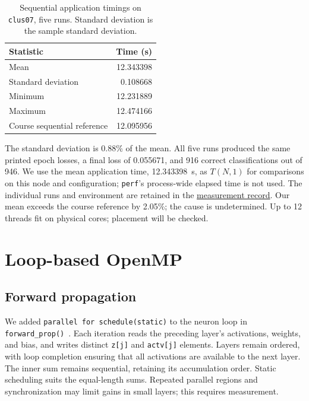 \documentclass[10pt,a4paper,twocolumn]{article}
\begin{document}
\begin{table}[htbp]
  \centering
  \caption{Sequential application timings on \texttt{clus07}, five runs.
    Standard deviation is the sample standard deviation.}
  \label{tab:sequential-repetitions}
  \small
  \begin{tabular}{@{}lr@{}}
    \toprule
    Statistic & Time (s) \\
    \midrule
    Mean & 12.343398 \\
    Standard deviation & 0.108668 \\
    Minimum & 12.231889 \\
    Maximum & 12.474166 \\
    Course sequential reference & 12.095956 \\
    \bottomrule
  \end{tabular}
\end{table}

The standard deviation is 0.88\% of the mean. All five runs produced the
same printed epoch losses, a final loss of 0.055671, and 916 correct
classifications out of 946. We use the mean application time,
12.343398~s, as $T(N,1)$ for comparisons on this node and configuration;
\texttt{perf}'s process-wide elapsed time is not used. The individual runs
and environment are retained in the
\href{../../results/sequential_baseline.json}{measurement record}.
Our mean exceeds the course reference by 2.05\%; the cause is undetermined.
Up to 12 threads fit on physical cores; placement will be checked.

\section{Loop-based OpenMP}

\subsection{Forward propagation}

We added \texttt{parallel for schedule(static)} to the neuron loop in
\texttt{forward\_prop()}~\cite{openmp-lecture}. Each iteration reads the
preceding layer's activations, weights, and bias, and writes distinct
\texttt{z[j]} and \texttt{actv[j]} elements. Layers remain ordered, with
loop completion ensuring that all activations are available to the next
layer. The inner sum remains sequential, retaining its accumulation order.
Static scheduling suits the equal-length sums. Repeated parallel regions
and synchronization may limit gains in small layers; this requires measurement.
\end{document}
